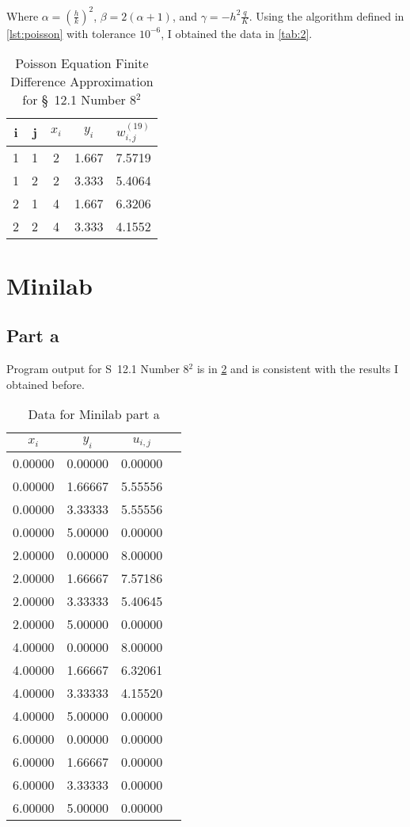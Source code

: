 \documentclass[12pt]{article}
\begin{document}
Where $\alpha=\left(\frac{h}{k}\right)^2$, 
$\beta=2(\alpha+1)$, and $\gamma=-h^2\frac{q}{K}$.
Using the algorithm defined in \cref{lst:poisson} with tolerance
$10^{-6}$, I obtained the data in \cref{tab:2}.
\begin{table}[H]
  \centering
  \begin{tabular}{ccccc}
      \hline
      i & j & $x_i$ & $y_i$ & $w_{i,j}^{(19)}$ \\
      \hline
      1 & 1 & 2 & 1.667 & 7.5719 \\
      1 & 2 & 2 & 3.333 & 5.4064 \\
      2 & 1 & 4 & 1.667 & 6.3206 \\
      2 & 2 & 4 & 3.333 & 4.1552 \\
      \hline
  \end{tabular}
  \caption{Poisson Equation Finite Difference Approximation for
    \S~12.1 Number 8$^2$}
  \label{tab:8}
\end{table}

\section{Minilab}
\subsection{Part a}
Program output for S~12.1 Number 8$^2$ is in \cref{tab:mini_a} and is
consistent with the results I obtained before.
\begin{table}[h]
  \centering
  \begin{tabular}{cccc}
    \hline
    $x_i$ & $y_i$ & $u_{i,j}$ \\
    \hline
    0.00000 & 0.00000 & 0.00000 \\
    0.00000 & 1.66667 & 5.55556 \\
    0.00000 & 3.33333 & 5.55556 \\
    0.00000 & 5.00000 & 0.00000 \\
    2.00000 & 0.00000 & 8.00000 \\
    2.00000 & 1.66667 & 7.57186 \\
    2.00000 & 3.33333 & 5.40645 \\
    2.00000 & 5.00000 & 0.00000 \\
    4.00000 & 0.00000 & 8.00000 \\
    4.00000 & 1.66667 & 6.32061 \\
    4.00000 & 3.33333 & 4.15520 \\
    4.00000 & 5.00000 & 0.00000 \\
    6.00000 & 0.00000 & 0.00000 \\
    6.00000 & 1.66667 & 0.00000 \\
    6.00000 & 3.33333 & 0.00000 \\
    6.00000 & 5.00000 & 0.00000 \\
    \hline
  \end{tabular}
  \caption{Data for Minilab part a}
\label{tab:mini_a}
\end{table}
\end{document}
